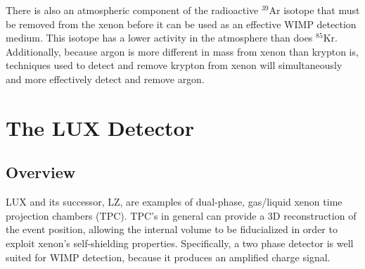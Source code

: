 There is also an atmospheric component of the radioactive $^{39}$Ar isotope that must be removed from the xenon before it can be used as an effective WIMP detection medium. This isotope has a lower activity in the atmosphere than does $^{85}$Kr. Additionally, because argon is more different in mass from xenon than krypton is, techniques used to detect and remove krypton from xenon will simultaneously and more effectively detect and remove argon.

\section{The LUX Detector}
\subsection{Overview}
LUX and its successor, LZ, are examples of dual-phase, gas/liquid xenon time projection chambers (TPC). TPC's in general can provide a 3D reconstruction of the event position, allowing the internal volume to be fiducialized in order to exploit xenon's self-shielding properties. Specifically, a two phase detector is well suited for WIMP detection, because it produces an amplified charge signal. 

